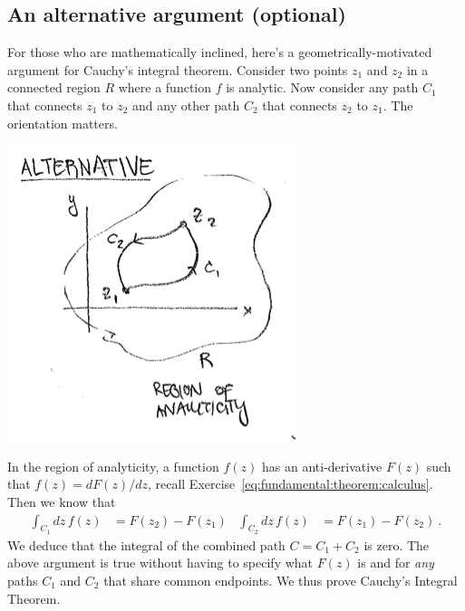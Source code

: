 \subsection{An alternative argument (optional)}


For those who are mathematically inclined, here's a geometrically-motivated argument for Cauchy's integral theorem. Consider two points $z_1$ and $z_2$ in a connected region $R$ where a function $f$ is analytic. Now consider any path $C_1$ that connects $z_1$ to $z_2$ and any other path $C_2$ that connects $z_2$ to $z_1$. The orientation matters.
\begin{center}
\includegraphics[width=.5\textwidth]{figures/Lec_2017_paths.png}
\end{center}
In the region of analyticity, a function $f(z)$ has an anti-derivative $F(z)$ such that $f(z) = dF(z)/dz$, recall Exercise~\ref{eq:fundamental:theorem:calculus}. Then we know that
\begin{align}
	\int_{C_1} dz\, f(z) &= F(z_2) - F(z_1)
	&
	\int_{C_2} dz\, f(z) &= F(z_1) - F(z_2) \ .
\end{align}
We deduce that the integral of the combined path $C=C_1+C_2$ is zero. The above argument is true without having to specify what $F(z)$ is and for \emph{any} paths $C_1$ and $C_2$ that share common endpoints. We thus prove Cauchy's Integral Theorem.

